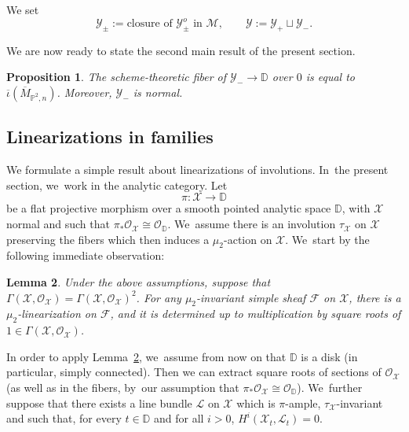\documentclass[11pt]{article}
\newcommand{\DD}{{\mathbb D}}
\newcommand{\PP}{{\mathbb P}}\let\P\PP
\newcommand\cF{\mathcal{F}}
\newcommand\cL{\mathcal{L}}
\newcommand\cM{\mathcal{M}}
\newcommand\cO{\mathcal{O}}
\newcommand\cX{\mathcal{X}}
\newcommand\cY{\mathcal{Y}}
\let\ov\overline
\newtheorem{lemm}{Lemma}[section]
\newtheorem{prop}[lemm]{Proposition}
\theoremstyle{definition}
\begin{document}
We set
\begin{equation*}\label{eq:DefYprimeFamily}
\cY_{\pm} :=\text{closure of $\cY_{\pm}^o$ in $\cM$},\qquad
\cY:=\cY_{+}\sqcup \cY_{-}.
\end{equation*}

We are now ready to state the second main result of the present section.

\begin{prop}\label{prop:negfiber}
The scheme-theoretic fiber of $\cY_{-}\to\DD$ over $0$ is equal to $\ov{\iota}(\ov{M}_{\PP^2,n})$. Moreover, $\cY_{-}$ is normal.
\end{prop}

\subsection{Linearizations in families}\label{subsec:LinearizationFamily}

We formulate a simple result about linearizations of involutions. In~the present section, we~work in the analytic category.
Let
\[
\pi\colon \cX \to \DD
\]
be a flat projective morphism over a smooth pointed analytic space $\DD$, with $\cX$ normal and such that $\pi_{*}{\cO}_{\cX}\cong{\cO}_\DD$. We~assume there is an involution $\tau_{\cX}$ on $\cX$ preserving the fibers which then induces a $\mu_2$-action on $\cX$. We~start by the following immediate observation:

\begin{lemm}\label{lem:LinearizationGeneral}
Under the above assumptions, suppose that $\Gamma(\cX, {\cO}_{\cX})=\Gamma(\cX,{\cO}_{\cX})^2$.
For any $\mu_2$-invariant simple sheaf $\cF$ on $\cX$, there is a $\mu_2$-linearization on $\cF$, and it is determined up to multiplication by square roots of $1\in \Gamma(\cX, {\cO}_{\cX})$.
\end{lemm}

In order to apply Lemma~\ref{lem:LinearizationGeneral}, we~assume from now on that $\DD$ is a disk (in particular, simply connected).
Then we can extract square roots of sections of $\cO_{\cX}$ (as well as in the fibers, by~our assumption that $\pi_{*}{\cO}_{\cX}\cong{\cO}_\DD$). We~further suppose that there exists a line bundle $\cL$ on $\cX$ which is $\pi$-ample, $\tau_{\cX}$-invariant and such that, for every $t\in\DD$ and for all $i>0$, $H^i(\mathcal{X}_t,\mathcal{L}_t)=0$.
\end{document}
